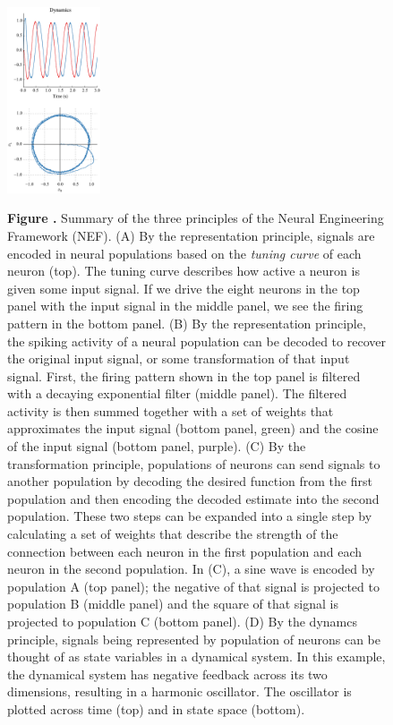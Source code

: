 \documentclass{frontiersSCNS}
\begin{document}
\begin{figure}
\begin{center}
  \includegraphics[width=0.245\textwidth]{nef_summary_dyn}
\end{center}
 \textbf{\label{fig:nef} Figure .}{
   Summary of the three principles of the Neural Engineering Framework
   (NEF). (A) By the representation principle, signals are encoded
   in neural populations based on the \textit{tuning curve}
   of each neuron (top). The tuning curve describes
   how active a neuron is given some input signal.
   If we drive the eight neurons in the top panel
   with the input signal in the middle panel,
   we see the firing pattern in the bottom panel.
   (B) By the representation principle,
   the spiking activity of a neural population
   can be decoded to recover the original input signal,
   or some transformation of that input signal.
   First, the firing pattern shown in the top panel
   is filtered with a decaying exponential filter (middle panel).
   The filtered activity is then summed together
   with a set of weights that approximates
   the input signal (bottom panel, green)
   and the cosine of the input signal (bottom panel, purple).
   (C) By the transformation principle,
   populations of neurons can send signals
   to another population by decoding
   the desired function from the first population
   and then encoding the decoded estimate
   into the second population.
   These two steps can be expanded into a single step
   by calculating a set of weights
   that describe the strength of the connection
   between each neuron in the first population
   and each neuron in the second population.
   In (C), a sine wave is encoded by population A (top panel);
   the negative of that signal is projected
   to population B (middle panel)
   and the square of that signal is projected
   to population C (bottom panel).
   (D) By the dynamcs principle,
   signals being represented by population of neurons
   can be thought of
   as state variables in a dynamical system.
   In this example, the dynamical system
   has negative feedback across its two dimensions,
   resulting in a harmonic oscillator.
   The oscillator is plotted across time (top)
   and in state space (bottom).}
\end{figure}
\end{document}
